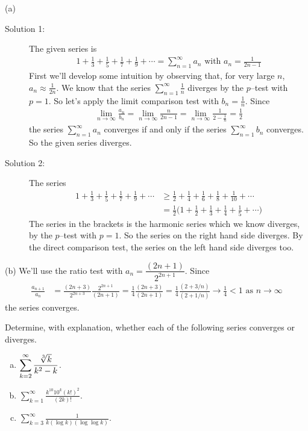 \begin{solution} (a)
\begin{description}
\item[Solution 1:]
 The given series is
\begin{align*}
1+\frac{1}{3}+\frac{1}{5}+\frac{1}{7}+\frac{1}{9}+\cdots
=\sum_{n=1}^\infty  a_n  \text{ with $a_n=\frac{1}{2n-1}$}
\end{align*}
First we'll develop some intuition by observing that, for very large $n$,
$a_n\approx \frac{1}{2n}$. We know that the series  $\sum\limits_{n=1}^\infty\frac{1}{n}$
diverges by the $p$--test with $p=1$. So let's apply the limit comparison
test with $b_n=\frac{1}{n}$. Since
\begin{align*}
\lim_{n\rightarrow\infty}\frac{a_n}{b_n}
=\lim_{n\rightarrow\infty}\frac{n}{2n-1}
=\lim_{n\rightarrow\infty}\frac{1}{2-\frac{1}{n}}
=\frac{1}{2}
\end{align*}
the series $\sum\limits_{n=1}^\infty  a_n$ converges if and only if the
series $\sum\limits_{n=1}^\infty  b_n$  converges. So the given series
diverges.

\item[Solution 2:]
 The series
\begin{align*}
1+\frac{1}{3}+\frac{1}{5}+\frac{1}{7}+\frac{1}{9}+\cdots
&\ge \frac{1}{2}+\frac{1}{4}+\frac{1}{6}+\frac{1}{8}+\frac{1}{10}+\cdots \\
&=\frac{1}{2}\Big(1+\frac{1}{2}+\frac{1}{3}+\frac{1}{4}+\frac{1}{5}+\cdots\Big)
\end{align*}
The series in the brackets is the harmonic series which
we know diverges, by the $p$--test with $p=1$. So the series on the right
hand side diverges. By the direct comparison test, the series on the left hand
side diverges too.
\end{description}
\noindent (b) We'll use the ratio test with $a_n=\dfrac{(2n+1)}{2^{2n+1}}$.
Since
\begin{align*}
\frac{a_{n+1}}{a_n}
&=\frac{(2n+3)}{2^{2n+3}}\frac{2^{2n+1}}{(2n+1)}
=\frac{1}{4}\frac{(2n+3)}{(2n+1)}
=\frac{1}{4}\frac{(2+3/n)}{(2+1/n)}
\rightarrow \frac{1}{4}<1\text{ as }n\rightarrow\infty
\end{align*}
the series converges.


\end{solution}

\begin{question}[M105 2013A]
Determine, with explanation, whether each of the following series converges or diverges.

\begin{enumerate}[(a)]
\item
${\displaystyle \sum_{k=2}^\infty \frac{\root{3}\of{k}}{k^2-k}}$.

\item
${\displaystyle \sum_{k=1}^\infty \frac{k^{10}10^k(k!)^2}{(2k)!}}$.

\item
${\displaystyle \sum_{k=3}^\infty \frac{1}{k(\log k) (\log\log k)}}$.
\end{enumerate}

\end{question}

